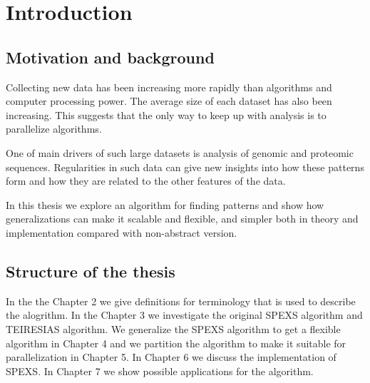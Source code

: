 \chapter{Introduction}

\section{Motivation and background}

Collecting new data has been increasing more rapidly than algorithms and
computer processing power. The average size of each dataset has also
been increasing. This suggests that the only way to keep up with
analysis is to parallelize algorithms.

One of main drivers of such large datasets is analysis
of genomic and proteomic sequences. Regularities in such data can 
give new insights into how these patterns form and how 
they are related to the other features of the data.

In this thesis we explore an algorithm for finding patterns and show how
generalizations can make it scalable and flexible, and simpler both in 
theory and implementation compared with non-abstract version.

\section{Structure of the thesis}

In the the Chapter 2 we give definitions for terminology that is used to
describe the alogrithm. In the Chapter 3 we investigate the original
SPEXS algorithm and TEIRESIAS algorithm. We generalize the SPEXS algorithm
to get a flexible algorithm in Chapter 4 and we partition the algorithm
to make it suitable for parallelization in Chapter 5. In Chapter 6 we
discuss the implementation of SPEXS. In Chapter 7 we show possible applications
for the algorithm.
